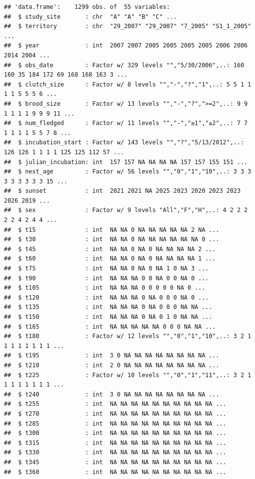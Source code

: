 \documentclass[]{article}
\begin{document}
\begin{verbatim}
## 'data.frame':    1299 obs. of  55 variables:
##  $ study_site       : chr  "A" "A" "B" "C" ...
##  $ territory        : chr  "29_2007" "29_2007" "7_2005" "S1_1_2005" ...
##  $ year             : int  2007 2007 2005 2005 2005 2005 2006 2006 2014 2004 ...
##  $ obs_date         : Factor w/ 329 levels "","5/30/2006",..: 160 160 35 184 172 69 168 168 163 3 ...
##  $ clutch_size      : Factor w/ 8 levels "","-","?","1",..: 5 5 1 1 1 1 5 5 5 6 ...
##  $ brood_size       : Factor w/ 13 levels "","-","?",">=2",..: 9 9 1 1 1 1 9 9 9 11 ...
##  $ num_fledged      : Factor w/ 11 levels "","-","≥1","≥2",..: 7 7 1 1 1 1 5 5 7 8 ...
##  $ incubation_start : Factor w/ 143 levels "","?","5/13/2012",..: 126 126 1 1 1 1 125 125 112 57 ...
##  $ julian_incubation: int  157 157 NA NA NA NA 157 157 155 151 ...
##  $ nest_age         : Factor w/ 56 levels "","0","1","10",..: 3 3 3 3 3 3 3 3 3 15 ...
##  $ sunset           : int  2021 2021 NA 2025 2023 2020 2023 2023 2026 2019 ...
##  $ sex              : Factor w/ 9 levels "All","F","H",..: 4 2 2 2 2 2 4 2 4 4 ...
##  $ t15              : int  NA NA 0 NA NA NA NA NA 2 NA ...
##  $ t30              : int  NA NA 0 NA NA NA NA NA NA 0 ...
##  $ t45              : int  NA NA 0 NA 0 NA NA NA NA 2 ...
##  $ t60              : int  NA NA 0 NA 0 NA NA NA NA 1 ...
##  $ t75              : int  NA NA 0 NA 0 NA 1 0 NA 3 ...
##  $ t90              : int  NA NA NA 0 0 NA 0 0 NA 0 ...
##  $ t105             : int  NA NA NA 0 0 0 0 0 NA 0 ...
##  $ t120             : int  NA NA NA 0 NA 0 0 0 NA 0 ...
##  $ t135             : int  NA NA NA 0 NA 0 0 0 NA NA ...
##  $ t150             : int  NA NA NA 0 NA 0 1 0 NA NA ...
##  $ t165             : int  NA NA NA NA NA 0 0 0 NA NA ...
##  $ t180             : Factor w/ 12 levels "","0","1","10",..: 3 2 1 1 1 1 1 1 1 1 ...
##  $ t195             : int  3 0 NA NA NA NA NA NA NA NA ...
##  $ t210             : int  2 0 NA NA NA NA NA NA NA NA ...
##  $ t225             : Factor w/ 10 levels "","0","1","11",..: 3 2 1 1 1 1 1 1 1 1 ...
##  $ t240             : int  3 0 NA NA NA NA NA NA NA NA ...
##  $ t255             : int  NA NA NA NA NA NA NA NA NA NA ...
##  $ t270             : int  NA NA NA NA NA NA NA NA NA NA ...
##  $ t285             : int  NA NA NA NA NA NA NA NA NA NA ...
##  $ t300             : int  NA NA NA NA NA NA NA NA NA NA ...
##  $ t315             : int  NA NA NA NA NA NA NA NA NA NA ...
##  $ t330             : int  NA NA NA NA NA NA NA NA NA NA ...
##  $ t345             : int  NA NA NA NA NA NA NA NA NA NA ...
##  $ t360             : int  NA NA NA NA NA NA NA NA NA NA ...

\end{verbatim}
\end{document}
